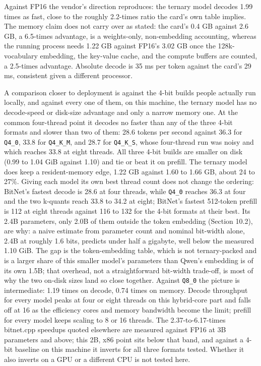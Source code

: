 \documentclass[11pt]{article}
\begin{document}
Against FP16 the vendor's direction reproduces: the ternary model decodes 1.99 times as
fast, close to the roughly 2.2-times ratio the card's own table implies. The memory
claim does not carry over as stated: the card's 0.4 GB against 2.6 GB, a 6.5-times
advantage, is a weights-only, non-embedding accounting, whereas the running process
needs 1.22 GB against FP16's 3.02 GB once the 128k-vocabulary embedding, the key-value
cache, and the compute buffers are counted, a 2.5-times advantage. Absolute decode is
35 ms per token against the card's 29 ms, consistent given a different processor.

A comparison closer to deployment is against the 4-bit builds people actually run
locally, and against every one of them, on this machine, the ternary model has no
decode-speed or disk-size advantage and only a narrow memory one. At the common
four-thread point it decodes no faster than any of the three 4-bit formats and slower
than two of them: 28.6 tokens per second against 36.3 for \texttt{Q4\_0}, 33.8 for \texttt{Q4\_K\_M}, and
28.7 for \texttt{Q4\_K\_S}, whose four-thread run was noisy and which reaches 33.8 at eight
threads. All three 4-bit builds are smaller on disk (0.99 to 1.04 GiB against 1.10) and
tie or beat it on prefill. The ternary model does keep a resident-memory edge, 1.22 GB
against 1.60 to 1.66 GB, about 24 to 27\%. Giving each model its own best thread count
does not change the ordering: BitNet's fastest decode is 28.6 at four threads, while
\texttt{Q4\_0} reaches 36.3 at four and the two k-quants reach 33.8 to 34.2 at eight; BitNet's
fastest 512-token prefill is 112 at eight threads against 116 to 132 for the 4-bit
formats at their best. Its 2.4B parameters, only 2.0B of them outside the token
embedding (Section 10.2), are why: a naive estimate from parameter count and nominal
bit-width alone, 2.4B at roughly 1.6 bits, predicts under half a gigabyte, well below
the measured 1.10 GiB. The gap is the token-embedding table, which is not
ternary-packed and is a larger share of this smaller model's parameters than Qwen's
embedding is of its own 1.5B; that overhead, not a straightforward bit-width trade-off,
is most of why the two on-disk sizes land so close together. Against \texttt{Q8\_0} the picture is intermediate: 1.19
times on decode, 0.74 times on memory. Decode throughput for every model peaks at four
or eight threads on this hybrid-core part and falls off at 16 as the efficiency cores
and memory bandwidth become the limit; prefill for every model keeps scaling to 8 or 16
threads. The 2.37-to-6.17-times bitnet.cpp speedups quoted elsewhere
\cite{Wang2024-1bitAIInfra} are measured against FP16 at 3B parameters and above; this 2B,
x86 point sits below that band, and against a 4-bit baseline on this machine it inverts
for all three formats tested. Whether it also inverts on a GPU or a different CPU is not
tested here.
\end{document}
